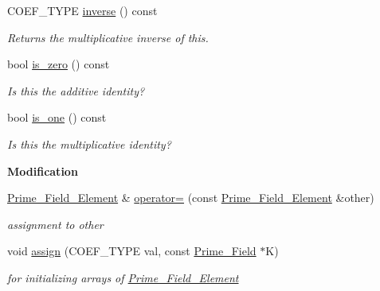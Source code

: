 \begin{Indent}
\begin{DoxyCompactItemize}
C\+O\+E\+F\+\_\+\+T\+Y\+PE \hyperlink{group___fields_group_a7e5881bb8b3f94aa8686e38e7ac78d65}{inverse} () const
\begin{DoxyCompactList}\small\item\em Returns the multiplicative inverse of {\ttfamily this}. \end{DoxyCompactList}\item 
\mbox{\label{group___fields_group_a50a94575283b1297a93eb41c22c599b2}} 
bool \hyperlink{group___fields_group_a50a94575283b1297a93eb41c22c599b2}{is\+\_\+zero} () const
\begin{DoxyCompactList}\small\item\em Is {\ttfamily this} the additive identity? \end{DoxyCompactList}\item 
\mbox{\label{group___fields_group_a69c26a37c2d6d3c996360d4f37cf6d98}} 
bool \hyperlink{group___fields_group_a69c26a37c2d6d3c996360d4f37cf6d98}{is\+\_\+one} () const
\begin{DoxyCompactList}\small\item\em Is {\ttfamily this} the multiplicative identity? \end{DoxyCompactList}\end{DoxyCompactItemize}
\end{Indent}
\begin{Indent}\textbf{ Modification}\par
\begin{DoxyCompactItemize}
\item 
\mbox{\label{group___fields_group_abdfe63d82185e9512775e129080d6023}} 
\hyperlink{group___fields_group_class_prime___field___element}{Prime\+\_\+\+Field\+\_\+\+Element} \& \hyperlink{group___fields_group_abdfe63d82185e9512775e129080d6023}{operator=} (const \hyperlink{group___fields_group_class_prime___field___element}{Prime\+\_\+\+Field\+\_\+\+Element} \&other)
\begin{DoxyCompactList}\small\item\em assignment to other \end{DoxyCompactList}\item 
\mbox{\label{group___fields_group_a5e94844996cf153ba8c9bc9b9cf518d5}} 
void \hyperlink{group___fields_group_a5e94844996cf153ba8c9bc9b9cf518d5}{assign} (C\+O\+E\+F\+\_\+\+T\+Y\+PE val, const \hyperlink{group___fields_group_class_prime___field}{Prime\+\_\+\+Field} $\ast$K)
\begin{DoxyCompactList}\small\item\em for initializing arrays of \hyperlink{group___fields_group_class_prime___field___element}{Prime\+\_\+\+Field\+\_\+\+Element} \end{DoxyCompactList}\end{DoxyCompactItemize}
\end{Indent}
